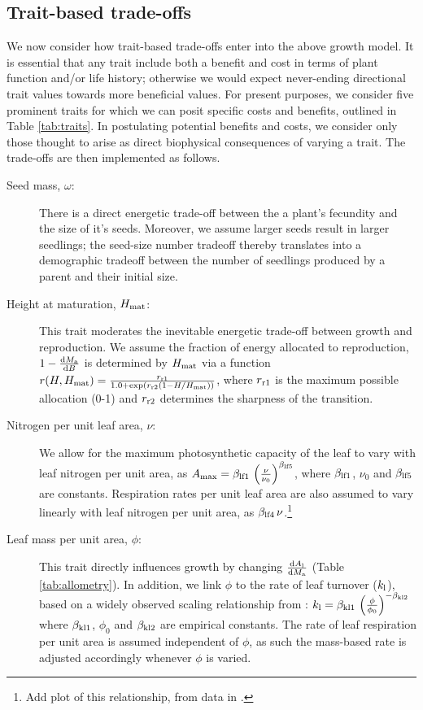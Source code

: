 \documentclass[a4paper,11pt]{article}
\begin{document}
\subsection{Trait-based trade-offs}

We now consider how trait-based trade-offs enter into the above growth model. It is essential that any trait include both a benefit and cost in terms of plant function and/or life history; otherwise we would expect never-ending directional trait values towards more beneficial values. For present purposes, we consider five prominent traits for which we can posit specific costs and benefits, outlined in Table \ref{tab:traits}. In postulating potential benefits and costs, we consider only those thought to arise as direct biophysical consequences of varying a trait. The trade-offs are then implemented as follows.
\begin{description}
\item[Seed mass, $\omega$:] There is a direct energetic trade-off between the a plant's fecundity and the size of it's seeds. Moreover, we assume larger seeds result in larger seedlings; the seed-size number tradeoff thereby translates into a demographic tradeoff between the number of seedlings produced by a parent and their initial size.
\item[Height at maturation, $H_{{\rm mat}}$:] This trait moderates the inevitable energetic trade-off between growth and reproduction. We assume the fraction of energy allocated to reproduction, $1- \frac{{\rm d}M_{{\rm a}}}{{\rm d}B}$ is determined by $H_{{\rm mat}}$ via a function $r(H, H_{{\rm mat}}) = \frac{r_{\rm r1}} {1.0 + \exp\left(r_{\rm r2} \left(1 - H / H_{{\rm mat}}\right)\right)}$, where $r_{\rm r1}$ is the maximum possible allocation (0-1) and $r_{\rm r2}$ determines the sharpness of the transition.
\item[Nitrogen per unit leaf area,  $\nu$:] We allow for the maximum photosynthetic capacity of the leaf to vary with leaf nitrogen per unit area, as $A_{\rm max} = \beta_{{\rm lf1}} \, \left(\frac{\nu}{\nu_0}\right)^{\beta_{{\rm lf5}}}$, where $\beta_{{\rm lf1}}$, $\nu_0$ and $\beta_{{\rm lf5}}$ are constants. Respiration rates per unit leaf area are also assumed to vary linearly with leaf nitrogen per unit area, as $\beta_{{\rm lf4}}\, \nu$.\footnote{Add plot of this relationship, from data in \citet{Wright-2004}.}
\item[Leaf mass per unit area, $\phi$:] This trait directly influences growth by changing $\frac{{\rm d}A_{\rm l}}{{\rm d}M_{\rm a}}$ (Table \ref{tab:allometry}). In addition, we link $\phi$ to the rate of leaf turnover ($k_{\rm l}$), based on a widely observed scaling relationship from \citet{Wright-2004}: $k_{\rm l} = \beta_{{\rm kl1}} \, \left(\frac{\phi}{\phi_0}\right)^{-\beta_{{\rm kl2}}}$ where $\beta_{{\rm kl1}}$, $\phi_0$ and $\beta_{{\rm kl2}}$ are empirical constants. The rate of leaf respiration per unit area is assumed independent of $\phi$, as such the mass-based rate is adjusted accordingly whenever $\phi$ is varied.

\end{description}
\end{document}
